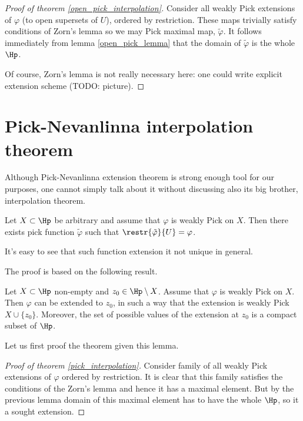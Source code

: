 \begin{proof}[Proof of theorem \ref{open_pick_interpolation}]
	Consider all weakly Pick extensions of $\varphi$ (to open supersets of $U$), ordered by restriction. These maps trivially satisfy conditions of Zorn's lemma so we may Pick maximal map, $\tilde{\varphi}$. It follows immediately from lemma \ref{open_pick_lemma} that the domain of $\tilde{\varphi}$ is the whole $\Hp$.

	Of course, Zorn's lemma is not really necessary here: one could write explicit extension scheme (TODO: picture).
\end{proof}

\section{Pick-Nevanlinna interpolation theorem}

Although Pick-Nevanlinna extension theorem is strong enough tool for our purposes, one cannot simply talk about it without discussing also its big brother, interpolation theorem.

\begin{lause}\label{pick_interpolation}
	Let $X \subset \Hp$ be arbitrary and assume that $\varphi$ is weakly Pick on $X$. Then there exists pick function $\tilde{\varphi}$ such that $\restr{\tilde{\varphi}}{U} = \varphi$.
\end{lause}

It's easy to see that such function extension it not unique in general.

The proof is based on the following result.

\begin{lem}\label{pick_extension_lemma}
	Let $X \subset \Hp$ non-empty and $z_{0} \in \Hp \setminus X$. Assume that $\varphi$ is weakly Pick on $X$. Then $\varphi$ can be extended to $z_{0}$, in such a way that the extension is weakly Pick $X \cup \{z_{0}\}$. Moreover, the set of possible values of the extension at $z_{0}$ is a compact subset of $\Hp$.
\end{lem}

Let us first proof the theorem given this lemma.

\begin{proof}[Proof of theorem \ref{pick_interpolation}]
	Consider family of all weakly Pick extensions of $\varphi$ ordered by restriction. It is clear that this family satisfies the conditions of the Zorn's lemma and hence it has a maximal element. But by the previous lemma domain of this maximal element has to have the whole $\Hp$, so it a sought extension.
\end{proof}

